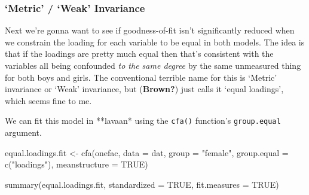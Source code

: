 \documentclass[
  letterpaper,
  DIV=11,
  numbers=noendperiod]{scrreprt}
\newenvironment{Shaded}{\begin{snugshade}}{\end{snugshade}}
\newcommand{\AttributeTok}[1]{\textcolor[rgb]{0.40,0.45,0.13}{#1}}
\newcommand{\ConstantTok}[1]{\textcolor[rgb]{0.56,0.35,0.01}{#1}}
\newcommand{\FunctionTok}[1]{\textcolor[rgb]{0.28,0.35,0.67}{#1}}
\newcommand{\NormalTok}[1]{\textcolor[rgb]{0.00,0.23,0.31}{#1}}
\newcommand{\OtherTok}[1]{\textcolor[rgb]{0.00,0.23,0.31}{#1}}
\newcommand{\StringTok}[1]{\textcolor[rgb]{0.13,0.47,0.30}{#1}}
\begin{document}
\hypertarget{metric-weak-invariance}{%
\subsubsection{`Metric' / `Weak'
Invariance}\label{metric-weak-invariance}}

Next we're gonna want to see if goodness-of-fit isn't significantly
reduced when we constrain the loading for each variable to be equal in
both models. The idea is that if the loadings are pretty much equal then
that's consistent with the variables all being confounded \emph{to the
same degree} by the same unmeasured thing for both boys and girls. The
conventional terrible name for this is `Metric' invariance or `Weak'
invariance, but (\textbf{Brown?}) just calls it `equal loadings', which
seems fine to me.

We can fit this model in **lavaan* using the \texttt{cfa()} function's
\texttt{group.equal} argument.

\begin{Shaded}
\begin{Highlighting}[]
\NormalTok{equal.loadings.fit }\OtherTok{\textless{}{-}} \FunctionTok{cfa}\NormalTok{(onefac, }\AttributeTok{data =}\NormalTok{ dat, }\AttributeTok{group =} \StringTok{"female"}\NormalTok{, }
  \AttributeTok{group.equal =} \FunctionTok{c}\NormalTok{(}\StringTok{"loadings"}\NormalTok{), }\AttributeTok{meanstructure =} \ConstantTok{TRUE}\NormalTok{) }

\FunctionTok{summary}\NormalTok{(equal.loadings.fit, }\AttributeTok{standardized =} \ConstantTok{TRUE}\NormalTok{, }\AttributeTok{fit.measures =} \ConstantTok{TRUE}\NormalTok{)}
\end{Highlighting}
\end{Shaded}
\end{document}
